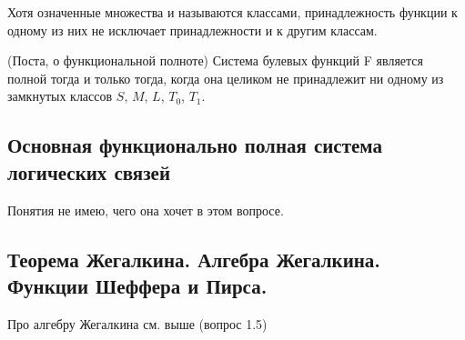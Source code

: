 \documentclass[14pt, a4paper]{extarticle}
\begin{document}
Хотя означенные множества и называются классами, принадлежность функции к одному из них не исключает принадлежности и к другим классам.

\begin{theorem}
  (Поста, о функциональной полноте) Система булевых функций F является полной тогда и только тогда, когда она целиком не принадлежит ни одному из замкнутых классов $S$, $M$, $L$, $T_{0}$, $T_{1}$.
\end{theorem}

\subsection{Основная функционально полная система логических связей}
Понятия не имею, чего она хочет в этом вопросе.

\subsection{Теорема Жегалкина. Алгебра Жегалкина. Функции Шеффера и Пирса.}
Про алгебру Жегалкина см. выше (вопрос 1.5)
\subsection{}
\end{document}
